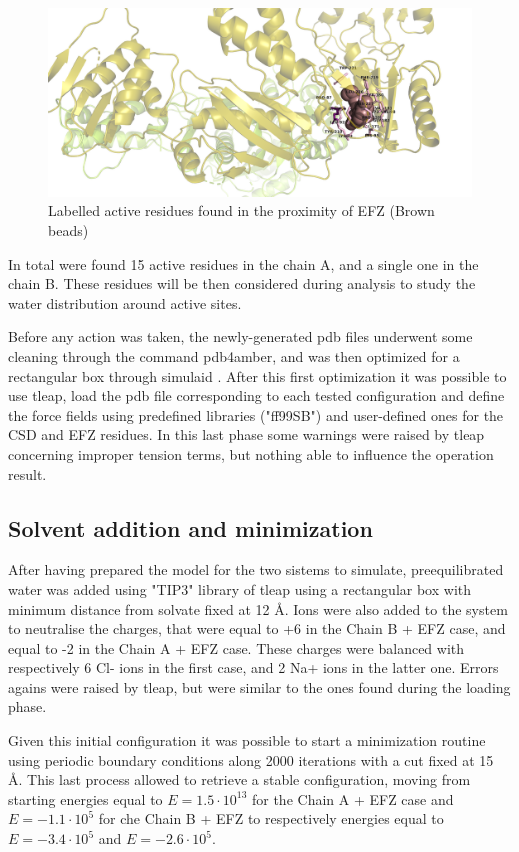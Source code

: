 \documentclass[12pt]{article}
\begin{document}
\begin{figure}
    \centering
    \includegraphics[width=\textwidth]{../figures/act_res.png}
    \caption{Labelled active residues found in the proximity of EFZ (Brown beads)\label{fig:sample}}
\end{figure}
In total were found 15 active residues in the chain A, and a single one in the chain B. These residues will be then considered during
analysis to study the water distribution around active sites.

Before any action was taken, the newly-generated pdb files underwent some cleaning through the command pdb4amber, and was then optimized for a rectangular box through simulaid \cite{simulaid}. After this first optimization it was possible to use tleap, load the pdb file corresponding to each tested configuration and define the force fields using predefined libraries ("ff99SB") and user-defined ones for the CSD and EFZ residues. In this last phase some warnings were raised by tleap concerning improper tension terms, but nothing able to influence the operation result.

\subsection{Solvent addition and minimization}
After having prepared the model for the two sistems to simulate, preequilibrated water was added using "TIP3" library of tleap using a rectangular box with minimum distance from solvate fixed at 12 \AA. Ions were also added to the system to neutralise the charges, that were equal to +6 in the Chain B + EFZ case, and equal to -2 in the Chain A + EFZ case.
These charges were balanced with respectively 6 Cl- ions in the first case, and 2 Na+ ions in the latter one. Errors agains were raised by tleap, but were similar to the ones found during the loading phase.

Given this initial configuration it was possible to start a minimization routine using periodic boundary conditions along 2000 iterations with a cut fixed at 15 \AA. This last process allowed to retrieve a stable configuration, moving from starting energies equal to $E=1.5\cdot 10^{13}$ for the Chain A + EFZ case and $E=-1.1\cdot 10^{5}$ for che Chain B + EFZ to respectively energies equal to $E=-3.4\cdot 10^{5}$ and $E=-2.6\cdot 10^{5}$.
\end{document}
